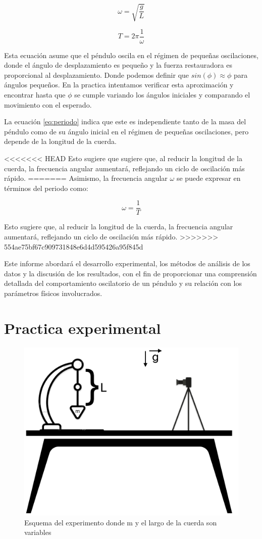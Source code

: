 \documentclass[12pt,a4]{article}
\begin{document}
\begin{equation}
    \omega = \sqrt{\frac{g}{L}}
    \label{eq:omega}
\end{equation}

\begin{equation}
    T = 2 \pi \frac{1}{\omega}
    \label{eq:periodo}
\end{equation}

Esta ecuación asume que el péndulo oscila en el régimen de pequeñas oscilaciones, donde el ángulo de desplazamiento es pequeño y la fuerza restauradora es proporcional al desplazamiento. Donde podemos definir que $sin(\phi) \approx \phi$ para ángulos pequeños. En la practica intentamos verificar esta aproximación y encontrar hasta que $\phi$ se cumple variando los ángulos iniciales y comparando el movimiento con el esperado.

La ecuación \ref{eq:periodo} indica que este es independiente tanto de la masa del péndulo como de su ángulo inicial en el régimen de pequeñas oscilaciones, pero depende de la longitud de la cuerda.

<<<<<<< HEAD
Esto sugiere que sugiere que, al reducir la longitud de la cuerda, la frecuencia angular aumentará, reflejando un ciclo de oscilación más rápido.
=======
Asimismo, la frecuencia angular \(\omega\) se puede expresar en términos del periodo como:

\begin{equation}
    \omega = \frac{1}{T}
    \label{eq:omega}
\end{equation}

Esto sugiere que, al reducir la longitud de la cuerda, la frecuencia angular aumentará, reflejando un ciclo de oscilación más rápido.
>>>>>>> 554ae75bf67c909731848e6d4d595426a95f845d

Este informe abordará el desarrollo experimental, los métodos de análisis de los datos y la discusión de los resultados, con el fin de proporcionar una comprensión detallada del comportamiento oscilatorio de un péndulo y su relación con los parámetros físicos involucrados.

\section{Practica experimental}

\begin{figure}[H]
    \centering
    \includegraphics[width=0.6\linewidth]{esquema.png}
    \caption{Esquema del experimento donde m y el largo de la cuerda son variables}   
    \label{fig:esquema}
\end{figure}
\end{document}
